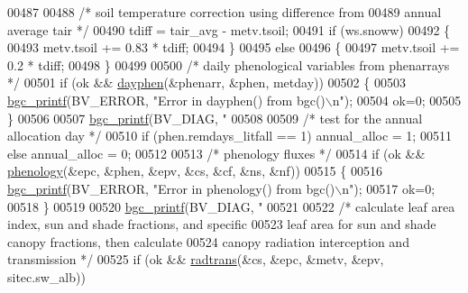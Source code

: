 \begin{DoxyCode}
{{{{{{{{00487     
00488             \textcolor{comment}{/* soil temperature correction using difference from}
00489 \textcolor{comment}{            annual average tair */}
00490             tdiff = tair\_avg - metv.tsoil;
00491             \textcolor{keywordflow}{if} (ws.snoww)
00492             \{
00493                 metv.tsoil += 0.83 * tdiff;
00494             \}
00495             \textcolor{keywordflow}{else}
00496             \{
00497                 metv.tsoil += 0.2 * tdiff;
00498             \}
00499             
00500             \textcolor{comment}{/* daily phenological variables from phenarrays */}
00501             \textcolor{keywordflow}{if} (ok && \hyperlink{dayphen_8c_a4fcbddc6285418ad6002546daa70c853}{dayphen}(&phenarr, &phen, metday))
00502             \{
00503                 \hyperlink{bgc__io_8c_af287cce6e2aede1ce337de9319e80d0d}{bgc\_printf}(BV\_ERROR, \textcolor{stringliteral}{"Error in dayphen() from bgc()\(\backslash\)n"});
00504                 ok=0;
00505             \}
00506             
00507             \hyperlink{bgc__io_8c_af287cce6e2aede1ce337de9319e80d0d}{bgc\_printf}(BV\_DIAG, \textcolor{stringliteral}{"%
00508     
00509             \textcolor{comment}{/* test for the annual allocation day */}
00510             \textcolor{keywordflow}{if} (phen.remdays\_litfall == 1) annual\_alloc = 1;
00511             \textcolor{keywordflow}{else} annual\_alloc = 0;
00512             
00513             \textcolor{comment}{/* phenology fluxes */}
00514             \textcolor{keywordflow}{if} (ok && \hyperlink{phenology_8c_a4db88c2b8b0b2fd1265efd4ba86acd8f}{phenology}(&epc, &phen, &epv, &cs, &cf, &ns, &nf))
00515             \{
00516                 \hyperlink{bgc__io_8c_af287cce6e2aede1ce337de9319e80d0d}{bgc\_printf}(BV\_ERROR, \textcolor{stringliteral}{"Error in phenology() from bgc()\(\backslash\)n"});
00517                 ok=0;
00518             \}
00519             
00520             \hyperlink{bgc__io_8c_af287cce6e2aede1ce337de9319e80d0d}{bgc\_printf}(BV\_DIAG, \textcolor{stringliteral}{"%
00521     
00522             \textcolor{comment}{/* calculate leaf area index, sun and shade fractions, and specific}
00523 \textcolor{comment}{            leaf area for sun and shade canopy fractions, then calculate}
00524 \textcolor{comment}{            canopy radiation interception and transmission */}
00525             \textcolor{keywordflow}{if} (ok && \hyperlink{radtrans_8c_a323e7fe52f825be6dfa95a158a812db4}{radtrans}(&cs, &epc, &metv, &epv, sitec.sw\_alb))
}}}}}}}}}}
\end{DoxyCode}
